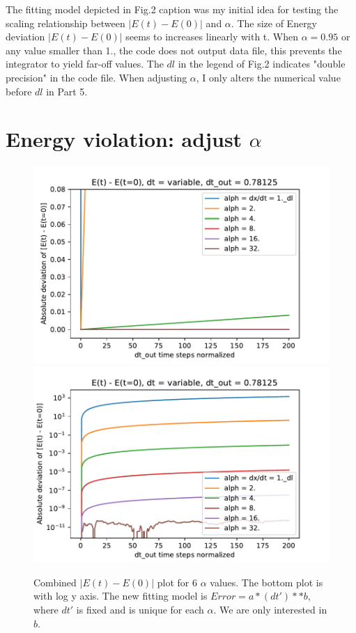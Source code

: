\documentclass{article}
\begin{document}
The fitting model depicted in Fig.2 caption was my initial idea for testing the scaling relationship between $|E(t) - E(0)|$ and $\alpha$. The size of Energy deviation $|E(t) - E(0)|$ seems to increases linearly with t. When $\alpha = 0.95$ or any value smaller than 1., the code does not output data file, this prevents the integrator to yield far-off values. The $dl$ in the legend of Fig.2 indicates "double precision" in the code file. When adjusting $\alpha$, I only alters the numerical value before $dl$ in Part 5. 

\section{Energy violation: adjust $\alpha$}


\begin{figure}[H]
    \centering
    \includegraphics[scale=0.7]{E_dev_alph_all}
    \includegraphics[scale=0.7]{E_dev_alph_all_log}
    \caption{Combined $|E(t) - E(0)|$ plot for 6 $\alpha$ values. The bottom plot is with log y axis. The new fitting model is $Error = a*(dt')**b$, where $dt'$ is fixed and is unique for each $\alpha$. We are only interested in $b$. }
    \label{fig:Q5}
\end{figure}
\end{document}
